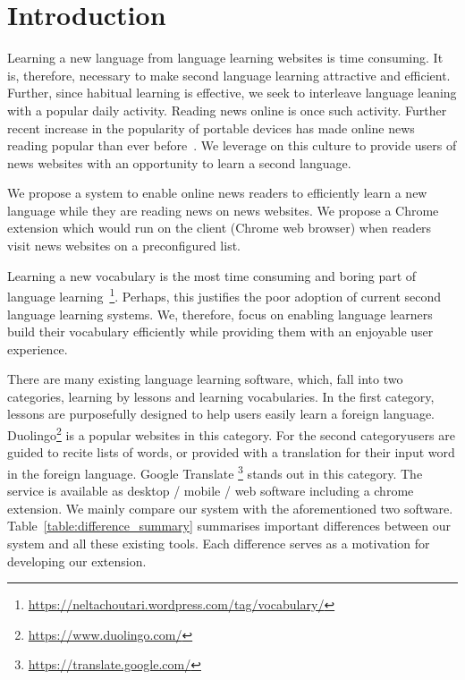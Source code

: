 \section{Introduction}
Learning a new language from language learning websites is 
time consuming. It is, therefore, necessary to make second 
language learning attractive and efficient. Further, since habitual 
learning is effective, we seek to interleave language leaning with 
a popular daily activity. Reading news online is once such 
activity. 
Further recent increase in the popularity of 
portable devices has made online news reading popular than ever 
before~\cite{yarlh2012}. We leverage on this culture to provide 
users of news websites with an opportunity to learn a second 
language.

We propose a system to enable online news readers to efficiently learn 
a new language while they are reading news on news websites. We propose 
a Chrome extension which would run on the client (Chrome web browser) 
when readers visit news websites on a preconfigured list.

Learning a new vocabulary is the most time consuming and boring part of 
language learning~\footnote{\url{https://neltachoutari.wordpress.com/tag/vocabulary/}}. 
Perhaps, this justifies the poor adoption of current second language learning 
systems. We, therefore, focus on enabling language learners build their vocabulary 
efficiently while providing them with an enjoyable user experience.

There are many existing language learning software, which, fall into two categories, 
learning by lessons and learning vocabularies. In the first category, 
lessons are purposefully designed to help users easily learn a foreign language.
Duolingo\footnote{\url{https://www.duolingo.com/}} is a popular websites in this category. 
For the second categoryusers are guided to recite lists of words, or provided with 
a translation for their input word in the foreign language. 
Google Translate \footnote{\url{https://translate.google.com/}} stands out in this 
category. The service is available as desktop / mobile / web software including a 
chrome extension. We mainly compare our system  with the aforementioned two software.
Table~\ref{table:difference_summary} summarises important differences between 
our system and all these existing tools. Each difference serves as a motivation 
for developing our extension.

